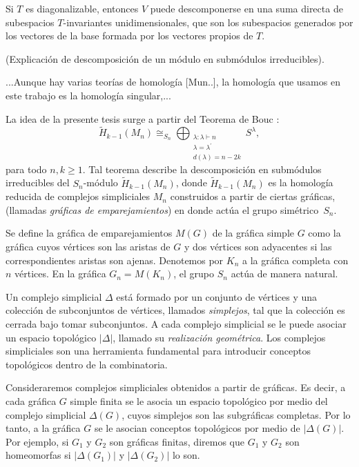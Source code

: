 \documentclass[12pt]{book}
\theoremstyle{definition}
\newcounter{in}
\newcounter{ini}
\begin{document}
Si $T$ es diagonalizable, entonces $V$ puede descomponerse en una suma
directa de subespacios $T$-invariantes unidimensionales, que son los
subespacios generados por los vectores de la base formada por los
vectores propios de $T$. 

(Explicación de descomposición de un módulo en submódulos
irreducibles).

...Aunque hay varias teorías de homología [Mun..], la homología que
usamos en este trabajo es la homología singular,...



La idea de la presente tesis surge a partir del Teorema de Bouc
\cite{MR756517}: 
\begin{equation*}
  \widetilde H_{k-1}(M_{n})\cong_{S_{n}}\bigoplus_{\substack{\lambda:\lambda\vdash n\\
      \lambda=\lambda^{'}\\d(\lambda)=n-2k}} S^{\lambda},
\end{equation*}
para todo $n,k\geq1$. Tal teorema describe la descomposición en
submódulos irreducibles del $S_{n}$-módulo $\widetilde
H_{k-1}(M_{n})$, donde $\widetilde H_{k-1}(M_{n})$ es la homología
reducida de complejos simpliciales $M_{n}$ construidos a partir de ciertas
gráficas, (llamadas \emph{gráficas de emparejamientos}) en donde actúa
el grupo simétrico~$S_{n}$.

Se define la gráfica de emparejamientos $M(G)$ de la gráfica simple
$G$ como la gráfica cuyos vértices son las aristas de $G$ y dos
vértices son adyacentes si las correspondientes aristas son
ajenas. Denotemos por $K_{n}$ a la gráfica completa con $n$
vértices. En la gráfica $G_{n}=M(K_{n})$, el grupo $S_{n}$ actúa de
manera natural.

Un complejo simplicial $\Delta$ está formado por un conjunto de
vértices y una colección de subconjuntos de vértices, llamados
\emph{simplejos}, tal que la colección es cerrada bajo tomar
subconjuntos. A cada complejo simplicial se le puede asociar un
espacio topológico $|\Delta|$, llamado su \emph{realización
  geométrica}. Los complejos simpliciales son una herramienta
fundamental para introducir conceptos topológicos dentro de la
combinatoria. 

Consideraremos complejos simpliciales obtenidos a partir de
gráficas. Es decir, a cada gráfica $G$ simple finita se le asocia un
espacio topológico por medio del complejo simplicial $\Delta(G)$, cuyos
simplejos son las subgráficas completas. Por lo tanto, a la gráfica
$G$ se le asocian conceptos topológicos por medio de
$|\Delta(G)|$. Por ejemplo, si $G_{1}$ y $G_{2}$ son gráficas finitas,
diremos que $G_{1}$ y $G_{2}$ son homeomorfas si $|\Delta(G_{1})|$
y $|\Delta(G_{2})|$ lo son.
\end{document}
